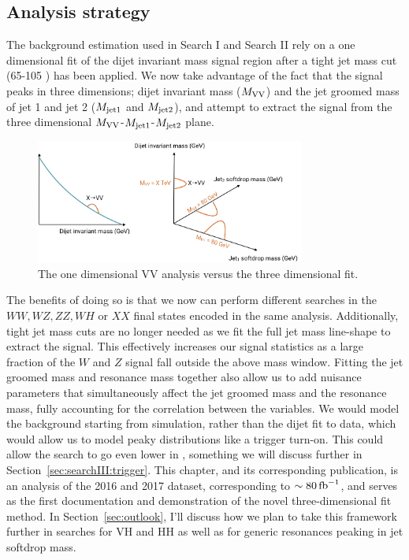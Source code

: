 \subsection{Analysis strategy}
The background estimation used in Search I and Search II rely on a one dimensional fit of the dijet invariant mass signal region after a tight jet mass cut (65-105 \GeV) has been applied.
We now take advantage of the fact that the signal peaks in three dimensions; dijet invariant mass ($M_{\rm VV}$) and the jet groomed mass of jet 1 and jet 2 ($M_{\rm jet1}$ and $M_{\rm jet2}$),
and attempt to extract the signal from the three dimensional $M_{\rm VV}$-$M_{\rm jet1}$-$M_{\rm jet2}$ plane.
\begin{figure}[h!] 
    \centering
    \includegraphics[width=0.79\textwidth]{figures/analysis/search3/misc/1Dvs3D.png}
    \caption{The one dimensional VV analysis versus the three dimensional fit.}
    \label{fig:searchIII:1Dvs3D}
\end{figure}
The benefits of doing so is that we now can perform different searches in the $WW, WZ, ZZ, WH$ or $XX$ final states encoded in the same analysis.
Additionally, tight jet mass cuts are no longer needed as we fit the full jet mass line-shape to extract the signal. This effectively increases our signal statistics
as a large fraction of the $W$ and $Z$ signal fall outside the above mass window.
Fitting the jet groomed mass and resonance mass together also allow us to add nuisance parameters that simultaneously affect the jet groomed mass and the resonance mass, fully accounting for the correlation between the variables.
We would model the background starting from simulation, rather than the dijet fit to data, which would allow us to model peaky distributions like a trigger turn-on. This could allow the search to go even lower in \MVV, something we will discuss further in Section~\ref{sec:searchIII:trigger}. \newline
This chapter, and its corresponding publication, is an analysis of the 2016 and 2017 dataset, corresponding to $\sim 80 \mbox{\ensuremath{\,\text{fb}^\text{$-$1}}}$, and serves as the first documentation and demonstration of the novel three-dimensional fit method. In Section~\ref{sec:outlook}, I'll discuss how we plan to take this framework further in searches for VH and HH as well as for generic resonances peaking in jet softdrop mass.
